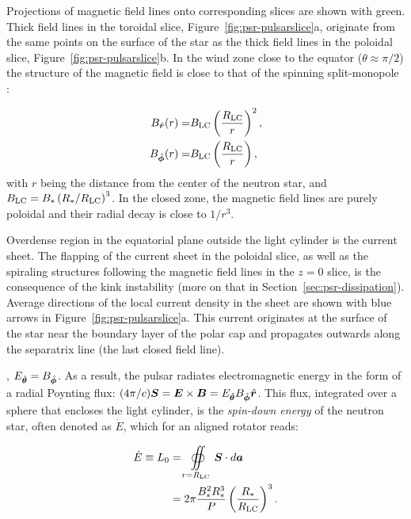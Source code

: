 Projections of magnetic field lines onto corresponding slices are shown with green. Thick field lines in the toroidal slice, Figure~\ref{fig:psr-pulsarslice}a, originate from the same points on the surface of the star as the thick field lines in the poloidal slice, Figure~\ref{fig:psr-pulsarslice}b. In the wind zone close to the equator ($\theta\approx \pi/2$) the structure of the magnetic field is close to that of the spinning split-monopole \citep{1973ApJ...180L.133M}:

\begin{equation}
\begin{split}
\label{eq:psr-bfields}
    B_{{\hat{\bm{r}}}}(r) =& B_{\rm LC}\left(\frac{R_{\rm LC}}{r}\right)^2,\\
    B_{{\hat{\bm{\phi}}}}(r) =& B_{\rm LC}\left(\frac{R_{\rm LC}}{r}\right),
\end{split}
\end{equation}
\noindent with $r$ being the distance from the center of the neutron star, and $B_{\rm LC} = B_*\left(R_*/R_{\rm LC}\right)^3$. In the closed zone, the magnetic field lines are purely poloidal and their radial decay is close to $1/r^3$. 

Overdense region in the equatorial plane outside the light cylinder is the current sheet. The flapping of the current sheet in the poloidal slice, as well as the spiraling structures following the magnetic field lines in the $z=0$ slice, is the consequence of the kink instability (more on that in Section~\ref{sec:psr-dissipation}). Average directions of the local current density in the sheet are shown with blue arrows in Figure~\ref{fig:psr-pulsarslice}a. This current originates at the surface of the star near the boundary layer of the polar cap and propagates outwards along the separatrix line (the last closed field line). 

, $E_{{\hat{\bm{\theta}}}} = B_{{\hat{\bm{\phi}}}}$. As a result, the pulsar radiates electromagnetic energy in the form of a radial Poynting flux: $(4\pi / c)\bm{S} = \bm{E}\times\bm{B} = E_{{\hat{\bm{\theta}}}} B_{{\hat{\bm{\phi}}}} {\hat{\bm{r}}}$. This flux, integrated over a sphere that encloses the light cylinder, is the \emph{spin-down energy} of the neutron star, often denoted as $\dot{E}$, which for an aligned rotator reads:

\begin{equation}
\label{eq:psr-edot}
\begin{split}
    \dot{E} \equiv L_0 &= \oiint\limits_{r=R_{\rm LC}} \bm{S} \cdot d\bm{a} \\
    &= 2\pi \frac{B_*^2 R_*^3}{P}\left(\frac{R_*}{R_{\rm LC}}\right)^3.
\end{split}
\end{equation}

